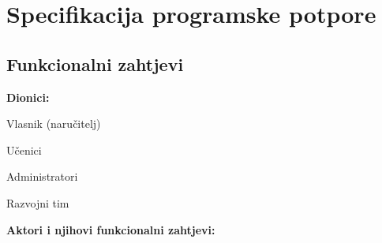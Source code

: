 \chapter{Specifikacija programske potpore}
		
\section{Funkcionalni zahtjevi}

\noindent \textbf{Dionici:}
			
\begin{packed_enum}
	
	\item Vlasnik (naručitelj)
	\item Učenici				
	\item Administratori
	\item Razvojni tim
	
\end{packed_enum}

\noindent \textbf{Aktori i njihovi funkcionalni zahtjevi:}
			
